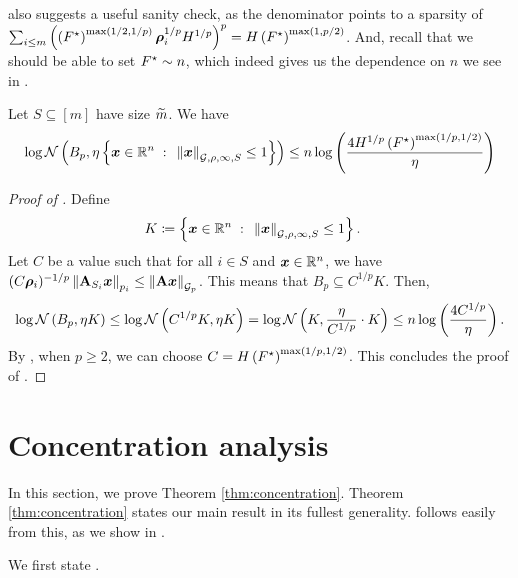 \documentclass[11pt]{article}
\numberwithin{equation}{section}
\begin{document}
 also suggests a useful sanity check, as the denominator points to a sparsity of $\sum_{i \le m} \left(\left(F^{\star}\right)^{\max(1/2,1/p)}\bm{\rho}_i^{1/p}H^{1/p}\right)^p = H\left(F^{\star}\right)^{\max(1,p/2)}$. And, recall that we should be able to set $F^{\star} \sim n$, which indeed gives us the dependence on $n$ we see in . 

\begin{lemma}
\label{lemma:covering_easy}
Let $S \subseteq [m]$ have size $\widetilde{m}$. We have
\begin{align*}
    \log\mathcal{N}\left(B_p,\eta\left\{\bm{x}\in\mathbb{R}^n{\;\; : \;\;}\left\lVert \bm{x} \right\rVert_{\mathcal{G},\rho,\infty, S}\le 1\right\}\right) \le n\log\left(\frac{4H^{1/p}\left(F^{\star}\right)^{\max(1/p,1/2)}}{\eta}\right)
\end{align*}
\end{lemma}
\begin{proof}[Proof of ]
Define
\begin{align*}
    K &\coloneqq \left\{\bm{x}\in\mathbb{R}^n{\;\; : \;\;}\left\lVert \bm{x} \right\rVert_{\mathcal{G},\rho,\infty, S}\le 1\right\}.
\end{align*}
Let $C$ be a value such that for all $i \in S$ and $\bm{x}\in\mathbb{R}^n$, we have $(C\bm{\rho}_i)^{-1/p}\left\lVert \mathbf{A}_{S_i}\bm{x} \right\rVert_{p_i} \le \left\lVert \mathbf{A}\bm{x} \right\rVert_{\mathcal{G}_{p}}$. This means that $B_p \subseteq C^{1/p} K$. Then,
\begin{align*}
    \log\mathcal{N}\left(B_p,\eta K\right) \le \log\mathcal{N}\left(C^{1/p} K, \eta K\right) = \log\mathcal{N}\left(K, \frac{\eta}{C^{1/p}} \cdot K\right) \le n\log\left(\frac{4C^{1/p}}{\eta}\right).
\end{align*}
By , when $p\ge 2$, we can choose $C = H\left(F^{\star}\right)^{\max(1/p,1/2)}$.
This concludes the proof of . 
\end{proof}

\section{Concentration analysis}
\label{sec:generic_chaining}

In this section, we prove Theorem \ref{thm:concentration}. Theorem \ref{thm:concentration} states our main result in its fullest generality.  follows easily from this, as we show in .

We first state .
\end{document}
